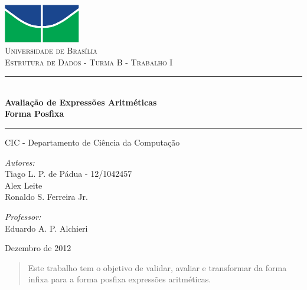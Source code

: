 \documentclass[a4paper,11pt]{article}
\newcommand{\HRule}{\rule{\linewidth}{0.5mm}}
\begin{document}
\begin{titlepage}
\begin{center}
 
\includegraphics[width=0.25\textwidth]{./unb.pdf}\\[1cm]
 
\textsc{\LARGE Universidade de Brasília}\\[1.5cm]
 
\textsc{\Large Estrutura de Dados - Turma B - Trabalho I}\\[0.5cm]
 
\HRule \\[0.4cm]
{ \huge \bfseries Avaliação de Expressões Aritméticas\\Forma Posfixa}
\HRule
\vspace{0.75cm}
\large CIC - Departamento de Ciência da Computação\\
\vspace{0.8cm}
\begin{minipage}{0.4\textwidth}
\begin{flushleft} \large
\emph{Autores:}\\
Tiago L. P. de Pádua - 12/1042457\\
Alex Leite\\
Ronaldo S. Ferreira Jr.\\
\end{flushleft}
\end{minipage}
\begin{minipage}{0.4\textwidth}
\begin{flushright} \large
\emph{Professor:} \\
Eduardo A. P. Alchieri
\end{flushright}
\end{minipage}
 
\vfill
 
{\large Dezembro de 2012}
\end{center}
\end{titlepage}

\pagestyle{plain}

\begin{abstract}
Este trabalho tem o objetivo de validar, avaliar e transformar da forma infixa para a forma posfixa expressões aritméticas.
\end{abstract}
\end{document}
